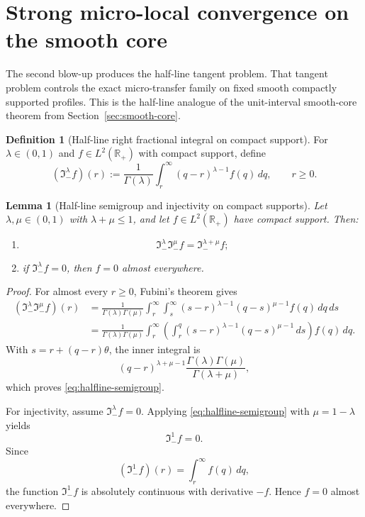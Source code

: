 \documentclass[11pt,a4paper]{amsart}
\theoremstyle{plain}
\newtheorem{lemma}[theorem]{Lemma}
\theoremstyle{definition}
\newtheorem{definition}[theorem]{Definition}
\theoremstyle{remark}
\newcommand{\R}{\mathbb{R}}
\begin{document}
\section{Strong micro-local convergence on the smooth core}\label{sec:micro-smooth}

The second blow-up produces the half-line tangent problem.  That tangent problem controls the exact
micro-transfer family on fixed smooth compactly supported profiles.  This is the half-line analogue
of the unit-interval smooth-core theorem from Section~\ref{sec:smooth-core}.

\begin{definition}[Half-line right fractional integral on compact support]
\label{def:halfline-fractional}
For \(\lambda\in(0,1)\) and \(f\in L^2(\R_+)\) with compact support, define
\begin{equation}\label{eq:Iminus-halfline}
(\mathfrak I_-^\lambda f)(r)
:=
\frac{1}{\Gamma(\lambda)}
\int_r^\infty (q-r)^{\lambda-1}f(q)\,dq,
\qquad r\ge0.
\end{equation}
\end{definition}

\begin{lemma}[Half-line semigroup and injectivity on compact supports]
\label{lem:halfline-semigroup}
Let \(\lambda,\mu\in(0,1)\) with \(\lambda+\mu\le 1\), and let \(f\in L^2(\R_+)\) have compact
support. Then:
\begin{enumerate}[label=(\roman*)]
\item
\begin{equation}\label{eq:halfline-semigroup}
\mathfrak I_-^\lambda \mathfrak I_-^\mu f
=
\mathfrak I_-^{\lambda+\mu}f;
\end{equation}
\item if \(\mathfrak I_-^\lambda f=0\), then \(f=0\) almost everywhere.
\end{enumerate}
\end{lemma}

\begin{proof}
For almost every \(r\ge0\), Fubini's theorem gives
\begin{align*}
(\mathfrak I_-^\lambda \mathfrak I_-^\mu f)(r)
&=
\frac{1}{\Gamma(\lambda)\Gamma(\mu)}
\int_r^\infty \int_s^\infty
(s-r)^{\lambda-1}(q-s)^{\mu-1}f(q)\,dq\,ds \\
&=
\frac{1}{\Gamma(\lambda)\Gamma(\mu)}
\int_r^\infty
\left(
\int_r^q (s-r)^{\lambda-1}(q-s)^{\mu-1}\,ds
\right)f(q)\,dq.
\end{align*}
With \(s=r+(q-r)\theta\), the inner integral is
\[
(q-r)^{\lambda+\mu-1}
\frac{\Gamma(\lambda)\Gamma(\mu)}{\Gamma(\lambda+\mu)},
\]
which proves \eqref{eq:halfline-semigroup}.

For injectivity, assume \(\mathfrak I_-^\lambda f=0\). Applying
\eqref{eq:halfline-semigroup} with \(\mu=1-\lambda\) yields
\[
\mathfrak I_-^1 f=0.
\]
Since
\[
(\mathfrak I_-^1 f)(r)=\int_r^\infty f(q)\,dq,
\]
the function \(\mathfrak I_-^1 f\) is absolutely continuous with derivative \(-f\). Hence
\(f=0\) almost everywhere.
\end{proof}
\end{document}
